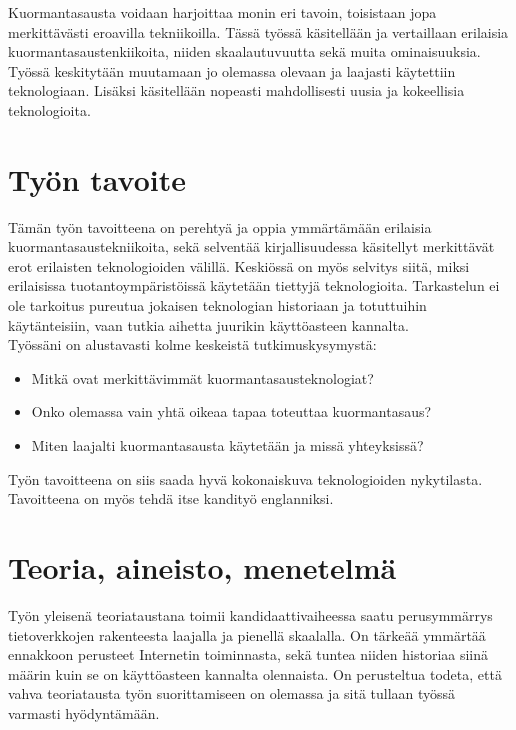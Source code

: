 \documentclass[finnish,12pt,a4paper,pdftex,elec,utf8]{aaltothesis}
\begin{document}
Kuormantasausta voidaan harjoittaa monin eri tavoin, toisistaan jopa merkittävästi eroavilla tekniikoilla.
Tässä työssä käsitellään ja vertaillaan erilaisia kuormantasaustenkiikoita, niiden skaalautuvuutta sekä muita ominaisuuksia.
Työssä keskitytään muutamaan jo olemassa olevaan ja laajasti käytettiin teknologiaan.
Lisäksi käsitellään nopeasti mahdollisesti uusia ja kokeellisia teknologioita.

\newpage

\section{Työn tavoite}
Tämän työn tavoitteena on perehtyä ja oppia ymmärtämään erilaisia kuormantasaustekniikoita, sekä selventää kirjallisuudessa käsitellyt merkittävät erot erilaisten teknologioiden välillä.
Keskiössä on myös selvitys siitä, miksi erilaisissa tuotantoympäristöissä käytetään tiettyjä teknologioita.
Tarkastelun ei ole tarkoitus pureutua jokaisen teknologian historiaan ja totuttuihin käytänteisiin, vaan tutkia aihetta juurikin käyttöasteen kannalta.\\

Työssäni on alustavasti kolme keskeistä tutkimuskysymystä:
\begin{itemize}
    \item Mitkä ovat merkittävimmät kuormantasausteknologiat?
    \item Onko olemassa vain yhtä oikeaa tapaa toteuttaa kuormantasaus?
    \item Miten laajalti kuormantasausta käytetään ja missä yhteyksissä?
\end{itemize}
Työn tavoitteena on siis saada hyvä kokonaiskuva teknologioiden nykytilasta.
Tavoitteena on myös tehdä itse kandityö englanniksi.

\newpage

\section{Teoria, aineisto, menetelmä}

Työn yleisenä teoriataustana toimii kandidaattivaiheessa saatu perusymmärrys tietoverkkojen rakenteesta laajalla ja pienellä skaalalla.
On tärkeää ymmärtää ennakkoon perusteet Internetin toiminnasta, sekä tuntea niiden historiaa siinä määrin kuin se on käyttöasteen kannalta olennaista.
On perusteltua todeta, että vahva teoriatausta työn suorittamiseen on olemassa ja sitä tullaan työssä varmasti hyödyntämään.
\end{document}
